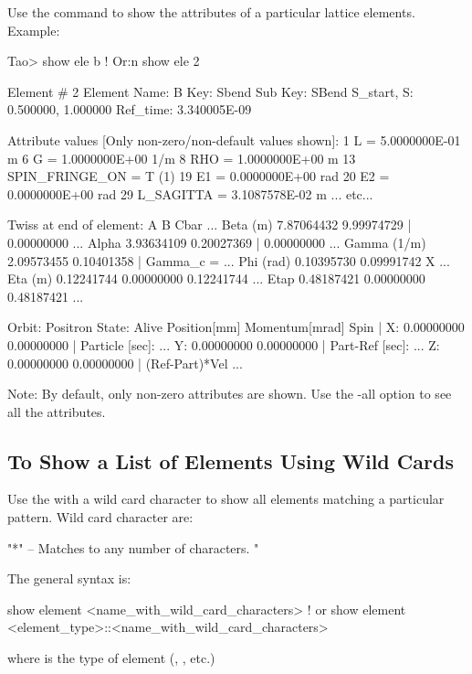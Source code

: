 \documentclass{hitec}
\begin{document}
Use the  command to show the attributes of a particular lattice elements. Example:
\begin{code} 
Tao> show ele b   ! Or:n show ele 2

 Element #                2
 Element Name: B
 Key: Sbend
 Sub Key: SBend
 S_start, S:    0.500000,    1.000000
 Ref_time:  3.340005E-09

 Attribute values [Only non-zero/non-default values shown]:
    1   L                            =  5.0000000E-01 m
    6   G                            =  1.0000000E+00 1/m
    8   RHO                          =  1.0000000E+00 m
   13   SPIN_FRINGE_ON               =  T (1)
   19   E1                           =  0.0000000E+00 rad
   20   E2                           =  0.0000000E+00 rad
   29   L_SAGITTA                    =  3.1087578E-02 m
     ... etc...

Twiss at end of element:
                          A              B            Cbar    ...
  Beta (m)         7.87064432     9.99974729  |   0.00000000  ...
  Alpha            3.93634109     0.20027369  |   0.00000000  ...
  Gamma (1/m)      2.09573455     0.10401358  |   Gamma_c =   ...
  Phi (rad)        0.10395730     0.09991742            X     ...
  Eta (m)          0.12241744     0.00000000     0.12241744   ...
  Etap             0.48187421     0.00000000     0.48187421   ...

Orbit:  Positron   State: Alive
         Position[mm] Momentum[mrad]        Spin   |
  X:       0.00000000     0.00000000               | Particle [sec]: ...
  Y:       0.00000000     0.00000000               | Part-Ref [sec]: ...
  Z:       0.00000000     0.00000000               | (Ref-Part)*Vel  ...
\end{code}
Note: By default, only non-zero attributes are shown. Use the -all option to see all the attributes.

\newpage

\subsection{To Show a List of Elements Using Wild Cards}

Use the  with a wild card character to show all elements matching a particular
pattern. Wild card character are:
\begin{code}
"*" -- Matches to any number of characters.
"%
\end{code}
The general syntax is:
\begin{code}
show element <name_with_wild_card_characters>                  ! or
show element <element_type>::<name_with_wild_card_characters>
\end{code}
where  is the type of element (, , etc.)
\end{document}

